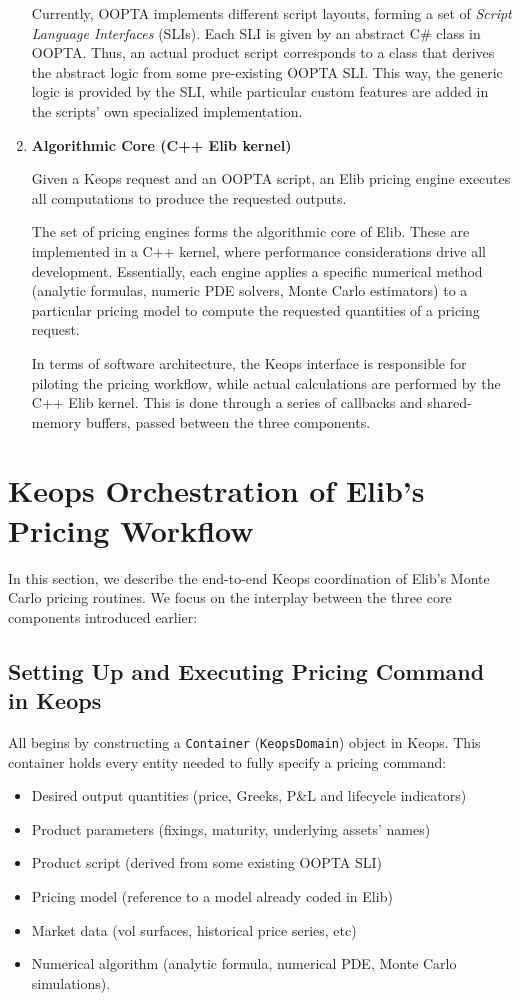 \documentclass[11pt]{article}
\begin{document}
\begin{enumerate}
    Currently, OOPTA implements different script layouts, forming a set of \emph{Script Language Interfaces} (SLIs).  Each SLI is given by an abstract C\# class in OOPTA.  Thus, an actual product script corresponds to a class that derives the abstract logic from some pre-existing OOPTA SLI. This way, the generic logic is provided by the SLI, while particular custom features are added in the scripts' own specialized implementation.

  \item \textbf{Algorithmic Core (C++ Elib kernel)}

     Given a Keops request and an OOPTA script, an Elib pricing engine executes all computations to produce the requested outputs. 
       
     The set of pricing engines forms the algorithmic core of Elib. These are implemented in a C++ kernel, where performance considerations drive all development. Essentially, each engine applies a specific numerical method (analytic formulas, numeric PDE solvers, Monte Carlo estimators) to a particular pricing model to compute the requested quantities of a pricing request.

     In terms of software architecture, the Keops interface is responsible for piloting  
     the pricing workflow, while actual calculations are performed by the C++ Elib kernel.
     This is done through a series of callbacks and shared-memory buffers, passed between the three components. 
\end{enumerate}


\section{Keops Orchestration of Elib’s Pricing Workflow}

In this section, we describe the end-to-end Keops coordination of Elib’s Monte Carlo pricing routines.  We focus on the interplay between the three core components introduced earlier:

\subsection{Setting Up and Executing Pricing Command in Keops}
All begins by constructing a \texttt{Container} (\texttt{KeopsDomain}) object in Keops.  This container holds every entity needed to fully specify a pricing command:
\begin{itemize}
  \item Desired output quantities (price, Greeks, P\&L and lifecycle indicators)
  \item Product parameters (fixings, maturity, underlying assets' names)
  \item Product script (derived from some existing OOPTA SLI)
  \item Pricing model (reference to a model already coded in Elib)
  \item Market data (vol surfaces, historical price series, etc)
  \item Numerical algorithm (analytic formula, numerical PDE, Monte Carlo simulations).
\end{itemize}
\end{document}
